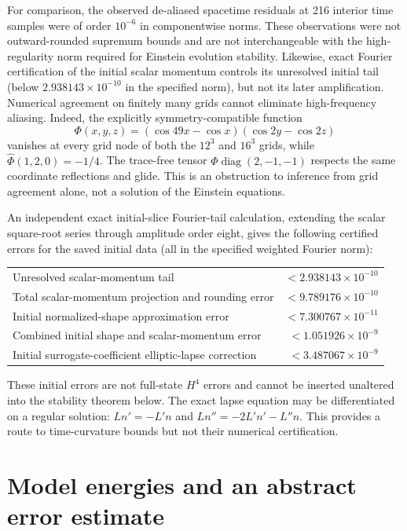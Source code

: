 \documentclass[11pt,a4paper]{article}
\theoremstyle{remark}
\begin{document}
For comparison, the observed de-aliased spacetime residuals at 216 interior time samples were of order $10^{-6}$ in componentwise norms. These observations were not outward-rounded supremum bounds and are not interchangeable with the high-regularity norm required for Einstein evolution stability. Likewise, exact Fourier certification of the initial scalar momentum controls its unresolved initial tail (below $2.938143\times10^{-10}$ in the specified norm), but not its later amplification. Numerical agreement on finitely many grids cannot eliminate high-frequency aliasing. Indeed, the explicitly symmetry-compatible function
\[
\Phi(x,y,z)=(\cos49x-\cos x)(\cos2y-\cos2z)
\]
vanishes at every grid node of both the $12^3$ and $16^3$ grids, while $\widehat\Phi(1,2,0)=-1/4$. The trace-free tensor $\Phi\operatorname{diag}(2,-1,-1)$ respects the same coordinate reflections and glide. This is an obstruction to inference from grid agreement alone, not a solution of the Einstein equations.

An independent exact initial-slice Fourier-tail calculation, extending the scalar square-root series through amplitude order eight, gives the following certified errors for the saved initial data (all in the specified weighted Fourier norm):
\begin{center}
\begin{tabular}{@{}p{.61\linewidth}r@{}}\toprule
Unresolved scalar-momentum tail & $<2.938143\times10^{-10}$\\
Total scalar-momentum projection and rounding error & $<9.789176\times10^{-10}$\\
Initial normalized-shape approximation error & $<7.300767\times10^{-11}$\\
Combined initial shape and scalar-momentum error & $<1.051926\times10^{-9}$\\
Initial surrogate-coefficient elliptic-lapse correction & $<3.487067\times10^{-9}$\\\bottomrule
\end{tabular}
\end{center}
These initial errors are not full-state $H^4$ errors and cannot be inserted unaltered into the stability theorem below. The exact lapse equation may be differentiated on a regular solution: $Ln'=-L'n$ and $Ln''=-2L'n'-L''n$. This provides a route to time-curvature bounds but not their numerical certification.

\section{Model energies and an abstract error estimate}
\end{document}
